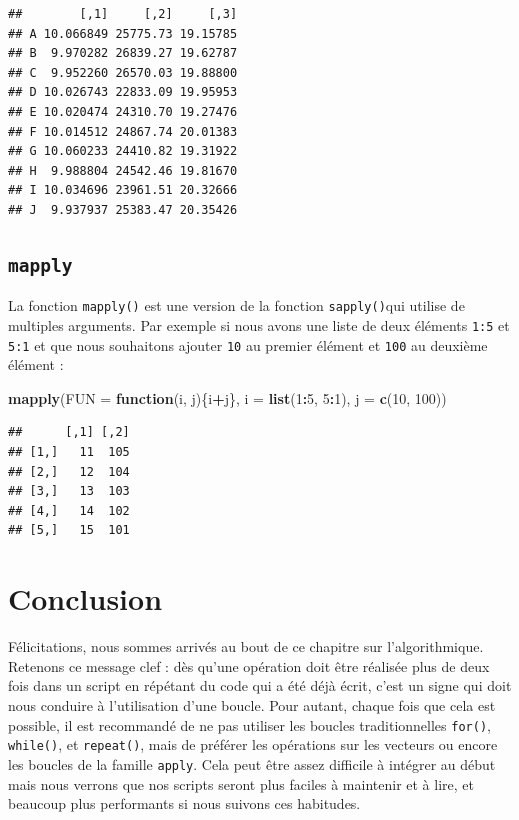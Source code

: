\documentclass[]{book}
\newenvironment{Shaded}{\begin{snugshade}}{\end{snugshade}}
\newcommand{\ControlFlowTok}[1]{\textcolor[rgb]{0.13,0.29,0.53}{\textbf{#1}}}
\newcommand{\DataTypeTok}[1]{\textcolor[rgb]{0.13,0.29,0.53}{#1}}
\newcommand{\DecValTok}[1]{\textcolor[rgb]{0.00,0.00,0.81}{#1}}
\newcommand{\KeywordTok}[1]{\textcolor[rgb]{0.13,0.29,0.53}{\textbf{#1}}}
\newcommand{\NormalTok}[1]{#1}
\newcommand{\OperatorTok}[1]{\textcolor[rgb]{0.81,0.36,0.00}{\textbf{#1}}}
\begin{document}
\begin{verbatim}
##        [,1]     [,2]     [,3]
## A 10.066849 25775.73 19.15785
## B  9.970282 26839.27 19.62787
## C  9.952260 26570.03 19.88800
## D 10.026743 22833.09 19.95953
## E 10.020474 24310.70 19.27476
## F 10.014512 24867.74 20.01383
## G 10.060233 24410.82 19.31922
## H  9.988804 24542.46 19.81670
## I 10.034696 23961.51 20.32666
## J  9.937937 25383.47 20.35426
\end{verbatim}

\hypertarget{l17mapply}{%
\subsection{\texorpdfstring{\texttt{mapply}}{mapply}}\label{l17mapply}}

La fonction \texttt{mapply()} est une version de la fonction \texttt{sapply()}qui utilise de multiples arguments. Par exemple si nous avons une liste de deux éléments \texttt{1:5} et \texttt{5:1} et que nous souhaitons ajouter \texttt{10} au premier élément et \texttt{100} au deuxième élément :

\begin{Shaded}
\begin{Highlighting}[]
\KeywordTok{mapply}\NormalTok{(}\DataTypeTok{FUN =} \ControlFlowTok{function}\NormalTok{(i, j)\{i}\OperatorTok{+}\NormalTok{j\}, }\DataTypeTok{i =} \KeywordTok{list}\NormalTok{(}\DecValTok{1}\OperatorTok{:}\DecValTok{5}\NormalTok{, }\DecValTok{5}\OperatorTok{:}\DecValTok{1}\NormalTok{), }\DataTypeTok{j =} \KeywordTok{c}\NormalTok{(}\DecValTok{10}\NormalTok{, }\DecValTok{100}\NormalTok{))}
\end{Highlighting}
\end{Shaded}

\begin{verbatim}
##      [,1] [,2]
## [1,]   11  105
## [2,]   12  104
## [3,]   13  103
## [4,]   14  102
## [5,]   15  101
\end{verbatim}

\hypertarget{conclusion-6}{%
\section{Conclusion}\label{conclusion-6}}

Félicitations, nous sommes arrivés au bout de ce chapitre sur l'algorithmique. Retenons ce message clef : dès qu'une opération doit être réalisée plus de deux fois dans un script en répétant du code qui a été déjà écrit, c'est un signe qui doit nous conduire à l'utilisation d'une boucle. Pour autant, chaque fois que cela est possible, il est recommandé de ne pas utiliser les boucles traditionnelles \texttt{for()}, \texttt{while()}, et \texttt{repeat()}, mais de préférer les opérations sur les vecteurs ou encore les boucles de la famille \texttt{apply}. Cela peut être assez difficile à intégrer au début mais nous verrons que nos scripts seront plus faciles à maintenir et à lire, et beaucoup plus performants si nous suivons ces habitudes.
\end{document}
